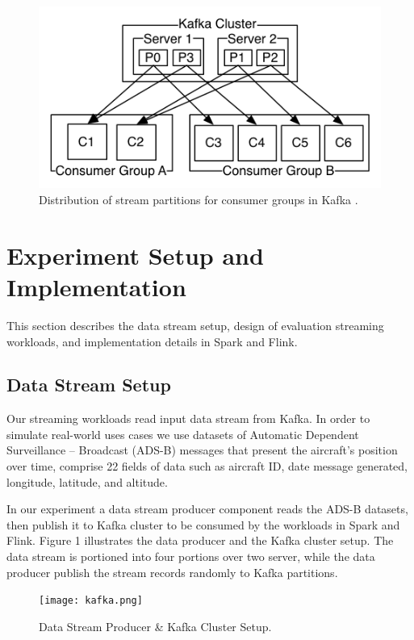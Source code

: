 \documentclass[]{article}
\begin{document}
\begin{figure}[h]
 
  \centering
    \includegraphics[width=\textwidth, height=.3\textheight]{kafka_groups.png}
     \caption{ Distribution of stream partitions for consumer groups in Kafka \cite{kafka}.}
\end{figure} 

\section{Experiment Setup and Implementation}
This section describes the data stream setup, design of evaluation streaming workloads, and implementation details in Spark and Flink.

\subsection{Data Stream Setup}
Our streaming workloads read input data stream from Kafka. In order to simulate real-world uses cases we use datasets of Automatic Dependent Surveillance – Broadcast (ADS-B) messages that present the aircraft's position over time, comprise 22 fields of data such as aircraft ID, date message generated, longitude, latitude, and altitude.
\par In our experiment a data stream producer component reads the ADS-B datasets, then publish it to Kafka cluster to be consumed by the workloads in Spark and Flink. Figure 1 illustrates the data producer and the Kafka cluster setup.
The data stream is portioned into four portions over two server, while the data producer publish the stream records randomly to Kafka partitions.

\begin{figure}[h]
 
  \centering
    \texttt{[image: kafka.png]}
     \caption{Data Stream Producer \& Kafka Cluster Setup.}
\end{figure} 
\end{document}
